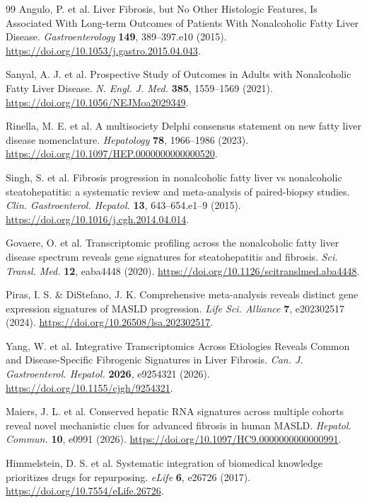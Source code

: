 \documentclass[11pt,a4paper]{article}
\begin{document}
\begin{thebibliography}{99}
 Angulo, P. et al. Liver Fibrosis, but No Other Histologic Features, Is Associated With Long-term Outcomes of Patients With Nonalcoholic Fatty Liver Disease. \textit{Gastroenterology} \textbf{149}, 389–397.e10 (2015). \url{https://doi.org/10.1053/j.gastro.2015.04.043}.

 Sanyal, A. J. et al. Prospective Study of Outcomes in Adults with Nonalcoholic Fatty Liver Disease. \textit{N. Engl. J. Med.} \textbf{385}, 1559–1569 (2021). \url{https://doi.org/10.1056/NEJMoa2029349}.

 Rinella, M. E. et al. A multisociety Delphi consensus statement on new fatty liver disease nomenclature. \textit{Hepatology} \textbf{78}, 1966–1986 (2023). \url{https://doi.org/10.1097/HEP.0000000000000520}.

 Singh, S. et al. Fibrosis progression in nonalcoholic fatty liver vs nonalcoholic steatohepatitis: a systematic review and meta-analysis of paired-biopsy studies. \textit{Clin. Gastroenterol. Hepatol.} \textbf{13}, 643--654.e1--9 (2015). \url{https://doi.org/10.1016/j.cgh.2014.04.014}.

 Govaere, O. et al. Transcriptomic profiling across the nonalcoholic fatty liver disease spectrum reveals gene signatures for steatohepatitis and fibrosis. \textit{Sci. Transl. Med.} \textbf{12}, eaba4448 (2020). \url{https://doi.org/10.1126/scitranslmed.aba4448}.

 Piras, I. S. \& DiStefano, J. K. Comprehensive meta-analysis reveals distinct gene expression signatures of MASLD progression. \textit{Life Sci. Alliance} \textbf{7}, e202302517 (2024). \url{https://doi.org/10.26508/lsa.202302517}.

 Yang, W. et al. Integrative Transcriptomics Across Etiologies Reveals Common and Disease-Specific Fibrogenic Signatures in Liver Fibrosis. \textit{Can. J. Gastroenterol. Hepatol.} \textbf{2026}, e9254321 (2026). \url{https://doi.org/10.1155/cjgh/9254321}.

 Maiers, J. L. et al. Conserved hepatic RNA signatures across multiple cohorts reveal novel mechanistic clues for advanced fibrosis in human MASLD. \textit{Hepatol. Commun.} \textbf{10}, e0991 (2026). \url{https://doi.org/10.1097/HC9.0000000000000991}.

 Himmelstein, D. S. et al. Systematic integration of biomedical knowledge prioritizes drugs for repurposing. \textit{eLife} \textbf{6}, e26726 (2017). \url{https://doi.org/10.7554/eLife.26726}.


\end{thebibliography}
\end{document}
